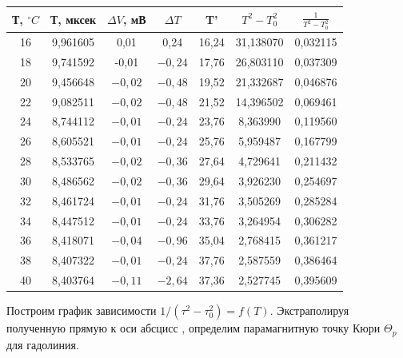 \documentclass[a4paper, 12pt]{article}%
\begin{document}
\begin{center}
\begin{table}[!h]
\begin{tabular}{|c|c|c|c|c|c|c|}
\hline Т, $^{\circ} C$ & Т, мксек & $\Delta V$, мВ & $\Delta T$ & T' & $T^2-T_0^2$ & $\frac{1}{T^2-T_0^2}$ \\
\hline 16 & 9,961605 & 0,01 & 0,24 & 16,24 & 31,138070 & 0,032115 \\
\hline 18 & 9,741592 & -0,01 & $-0,24$ & 17,76 & 26,803110 & 0,037309 \\
\hline 20 & 9,456648 & $-0,02$ & $-0,48$ & 19,52 & 21,332687 & 0,046876 \\
\hline 22 & 9,082511 & $-0,02$ & $-0,48$ & 21,52 & 14,396502 & 0,069461 \\
\hline 24 & 8,744112 & $-0,01$ & $-0,24$ & 23,76 & 8,363990 & 0,119560 \\
\hline 26 & 8,605521 & $-0,01$ & $-0,24$ & 25,76 & 5,959487 & 0,167799 \\
\hline 28 & 8,533765 & $-0,02$ & $-0,36$ & 27,64 & 4,729641 & 0,211432 \\
\hline 30 & 8,486562 & $-0,02$ & $-0,36$ & 29,64 & 3,926230 & 0,254697 \\
\hline 32 & 8,461724 & $-0,01$ & $-0,24$ & 31,76 & 3,505269 & 0,285284 \\
\hline 34 & 8,447512 & $-0,01$ & $-0,24$ & 33,76 & 3,264954 & 0,306282 \\
\hline 36 & 8,418071 & $-0,04$ & $-0,96$ & 35,04 & 2,768415 & 0,361217 \\
\hline 38 & 8,407322 & $-0,01$ & $-0,24$ & 37,76 & 2,587559 & 0,386464 \\
\hline 40 & 8,403764 & $-0,11$ & $-2,64$ & 37,36 & 2,527745 & 0,395609 \\
\hline
\end{tabular}
\end{table}
\end{center}

Построим график зависимости $1 /\left(\tau^{2} - \tau_{0}^{2}\right)=f(T)$. Экстраполируя полученную прямую к оси абсцисс , определим парамагнитную точку Кюри $\Theta_{p}$ для гадолиния.
\end{document}
